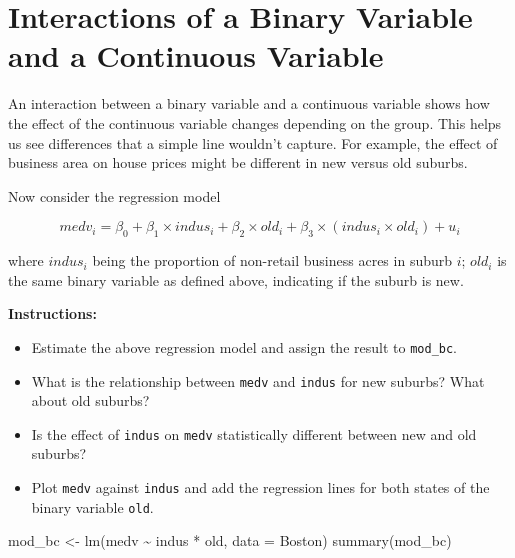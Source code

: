 \documentclass[
  12pt,
  letterpaper,
]{scrbook}
\newenvironment{Shaded}{\begin{snugshade}}{\end{snugshade}}
\newcommand{\AttributeTok}[1]{\textcolor[rgb]{0.40,0.45,0.13}{#1}}
\newcommand{\FunctionTok}[1]{\textcolor[rgb]{0.28,0.35,0.67}{#1}}
\newcommand{\NormalTok}[1]{\textcolor[rgb]{0.00,0.23,0.31}{#1}}
\newcommand{\OtherTok}[1]{\textcolor[rgb]{0.00,0.23,0.31}{#1}}
\newcommand{\SpecialCharTok}[1]{\textcolor[rgb]{0.37,0.37,0.37}{#1}}
\providecommand{\tightlist}{%
  \setlength{\itemsep}{0pt}\setlength{\parskip}{0pt}}
\renewcommand{\tightlist}{\setlength{\itemsep}{0.5\baselineskip}\setlength{\parskip}{0.2\baselineskip}}
\theoremstyle{plain}
\theoremstyle{definition}
\theoremstyle{remark}
\begin{document}
\section{Interactions of a Binary Variable and a Continuous
Variable}\label{interactions-of-a-binary-variable-and-a-continuous-variable}

An interaction between a binary variable and a continuous variable shows
how the effect of the continuous variable changes depending on the
group. This helps us see differences that a simple line wouldn't
capture. For example, the effect of business area on house prices might
be different in new versus old suburbs.

Now consider the regression model

\[
medv_i = \beta_0 + \beta_1 \times indus_i + \beta_2 \times old_i + \beta_3 \times (indus_i\times old_i) + u_i
\]

where \(indus_i\) being the proportion of non-retail business acres in
suburb \(i\); \(old_i\) is the same binary variable as defined above,
indicating if the suburb is new.

\textbf{Instructions:}

\begin{itemize}
\tightlist
\item
  Estimate the above regression model and assign the result to
  \texttt{mod\_bc}.
\item
  What is the relationship between \texttt{medv} and \texttt{indus} for
  new suburbs? What about old suburbs?
\item
  Is the effect of \texttt{indus} on \texttt{medv} statistically
  different between new and old suburbs?
\item
  Plot \texttt{medv} against \texttt{indus} and add the regression lines
  for both states of the binary variable \texttt{old}.
\end{itemize}

\begin{Shaded}
\begin{Highlighting}[]
\NormalTok{mod\_bc }\OtherTok{\textless{}{-}} \FunctionTok{lm}\NormalTok{(medv }\SpecialCharTok{\textasciitilde{}}\NormalTok{ indus }\SpecialCharTok{*}\NormalTok{ old, }\AttributeTok{data =}\NormalTok{ Boston)}
\FunctionTok{summary}\NormalTok{(mod\_bc)}
\end{Highlighting}
\end{Shaded}
\end{document}
